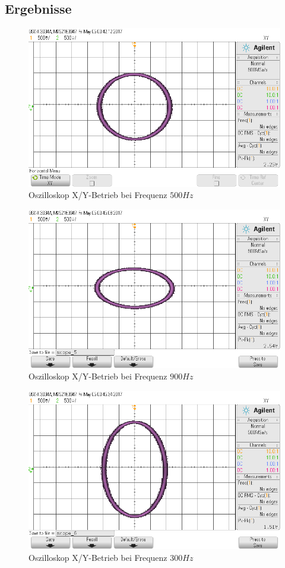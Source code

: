 \documentclass[12pt,a4paper,titlepage]{article}
\begin{document}
\subsection{Ergebnisse}
\begin{figure}[H]
  \centering
  \includegraphics[width=14cm]{oszi_xy_circle_500hz.png}
  \caption{Oszilloskop X/Y-Betrieb bei Frequenz $500 Hz$}
  \label{Figure7.6.1}
\end{figure}
\begin{figure}[H]
  \centering
  \includegraphics[width=14cm]{oszi_xy_circle_900hz.png}
  \caption{Oszilloskop X/Y-Betrieb bei Frequenz $900 Hz$}
  \label{Figure7.6.2}
\end{figure}
\begin{figure}[H]
  \centering
  \includegraphics[width=14cm]{oszi_xy_circle_300hz.png}
  \caption{Oszilloskop X/Y-Betrieb bei Frequenz $300 Hz$}
  \label{Figure7.6.3}
\end{figure}
\end{document}

